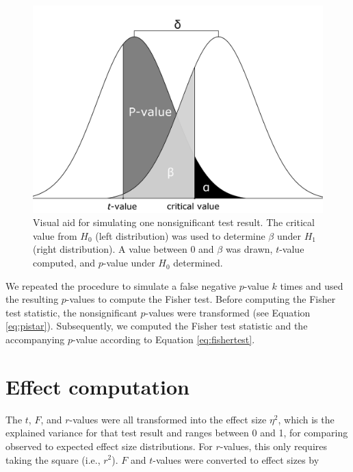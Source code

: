 \documentclass[a5paper]{book}
\begin{document}
\begin{figure}

{\centering \includegraphics[width=1\linewidth]{assets/figures/tgtbf-appendix_a} 

}

\caption{Visual aid for simulating one nonsignificant test result. The critical value from $H_0$ (left distribution) was used to determine $\beta$ under $H_1$ (right distribution). A value between 0 and $\beta$ was drawn, $t$-value computed, and $p$-value under $H_0$ determined.}\label{fig:appendix5a}
\end{figure}

We repeated the procedure to simulate a false negative \(p\)-value \(k\)
times and used the resulting \(p\)-values to compute the Fisher test.
Before computing the Fisher test statistic, the nonsignificant
\(p\)-values were transformed (see Equation \eqref{eq:pistar}).
Subsequently, we computed the Fisher test statistic and the accompanying
\(p\)-value according to Equation \eqref{eq:fishertest}.

\chapter{Effect computation}\label{effect-computation}

The \(t\), \(F\), and \(r\)-values were all transformed into the effect
size \(\eta^2\), which is the explained variance for that test result
and ranges between 0 and 1, for comparing observed to expected effect
size distributions. For \(r\)-values, this only requires taking the
square (i.e., \(r^2\)). \(F\) and \(t\)-values were converted to effect
sizes by
\end{document}
